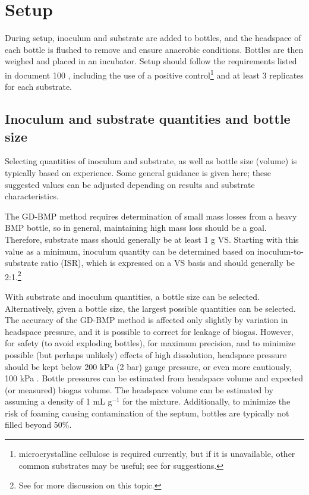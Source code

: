 \documentclass[]{article}
\begin{document}
\section{Setup}
\label{sec:setup}
During setup, inoculum and substrate are added to bottles, and the headspace of each bottle is flushed to remove  and ensure anaerobic conditions. 
Bottles are then weighed and placed in an incubator.
Setup should follow the requirements listed in document 100 \citep{BMPdoc100req}, including the use of a positive control\footnote{microcrystalline cellulose is required currently, but if it is unavailable, other common substrates may be useful; see \citet{kochEvaluationCommonSupermarket2020} for suggestions.}
and at least 3 replicates for each substrate.

\subsection{Inoculum and substrate quantities and bottle size}
\label{sec:quantities}
Selecting quantities of inoculum and substrate, as well as bottle size (volume) is typically based on experience.
Some general guidance is given here; these suggested values can be adjusted depending on results and substrate characteristics.

The GD-BMP method requires determination of small mass losses from a heavy BMP bottle, so in general, maintaining high mass loss should be a goal.
Therefore, substrate mass should generally be at least 1 g VS.
Starting with this value as a minimum, inoculum quantity can be determined based on inoculum-to-substrate ratio (ISR), which is expressed on a VS basis and should generally be 2:1.\footnote{See \citet{holligerStandardizationBiomethanePotential2016} for more discussion on this topic.}

With substrate and inoculum quantities, a bottle size can be selected.
Alternatively, given a bottle size, the largest possible quantities can be selected.
The accuracy of the GD-BMP method is affected only slightly by variation in headspace pressure, and it is possible to correct for leakage of biogas. 
However, for safety (to avoid exploding bottles), for maximum precision, and to minimize possible (but perhaps unlikely) effects of high  dissolution, headspace pressure should be kept below 200 kPa (2 bar) gauge pressure, or even more cautiously, 100 kPa \citep{hafnerSystematicErrorManometric2019}. 
Bottle pressures can be estimated from headspace volume and expected (or measured) biogas volume.
The headspace volume can be estimated by assuming a density of 1 mL g$^{-1}$ for the mixture.
Additionally, to minimize the risk of foaming causing contamination of the septum, bottles are typically not filled beyond 50\%.
\end{document}
